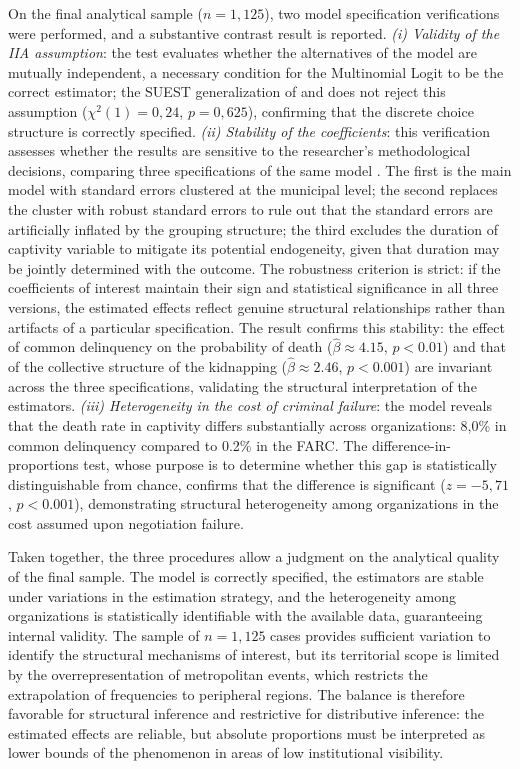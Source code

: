 \documentclass[ecta,nameyear,draft]{econsocart}
\theoremstyle{plain}
\theoremstyle{definition}
\newcommand{\1}{\mathbf{1}}
\begin{document}
On the final analytical sample ($n=1,125$), two model specification verifications were performed, and a substantive contrast result is reported. \textit{(i) Validity of the IIA assumption}: the test evaluates whether the alternatives of the model are mutually independent, a necessary condition for the Multinomial Logit to be the correct estimator; the SUEST generalization of \citet{HausmanMcFadden1984} and \citet{Weesie1999} does not reject this assumption ($\chi^2(1)=0{,}24$, $p=0{,}625$), confirming that the discrete choice structure is correctly specified. \textit{(ii) Stability of the coefficients}: this verification assesses whether the results are sensitive to the researcher's methodological decisions, comparing three specifications of the same model \citet{Wooldridge2010}. The first is the main model with standard errors clustered at the municipal level; the second replaces the cluster with robust standard errors to rule out that the standard errors are artificially inflated by the grouping structure; the third excludes the duration of captivity variable to mitigate its potential endogeneity, given that duration may be jointly determined with the outcome. The robustness criterion is strict: if the coefficients of interest maintain their sign and statistical significance in all three versions, the estimated effects reflect genuine structural relationships rather than artifacts of a particular specification. The result confirms this stability: the effect of common delinquency on the probability of death ($\hat{\beta}\approx 4.15$, $p<0.01$) and that of the collective structure of the kidnapping ($\hat{\beta}\approx 2.46$, $p<0.001$) are invariant across the three specifications, validating the structural interpretation of the estimators. \textit{(iii) Heterogeneity in the cost of criminal failure}: the model reveals that the death rate in captivity differs substantially across organizations: 8{,}0\% in common delinquency compared to 0.2\% in the FARC. The difference-in-proportions test, whose purpose is to determine whether this gap is statistically distinguishable from chance, confirms that the difference is significant ($z=-5{,}71$, $p<0.001$), demonstrating structural heterogeneity among organizations in the cost assumed upon negotiation failure.

Taken together, the three procedures allow a judgment on the analytical quality of the final sample. The model is correctly specified, the estimators are stable under variations in the estimation strategy, and the heterogeneity among organizations is statistically identifiable with the available data, guaranteeing internal validity. The sample of $n=1,125$ cases provides sufficient variation to identify the structural mechanisms of interest, but its territorial scope is limited by the overrepresentation of metropolitan events, which restricts the extrapolation of frequencies to peripheral regions. The balance is therefore favorable for structural inference and restrictive for distributive inference: the estimated effects are reliable, but absolute proportions must be interpreted as lower bounds of the phenomenon in areas of low institutional visibility.
\end{document}
